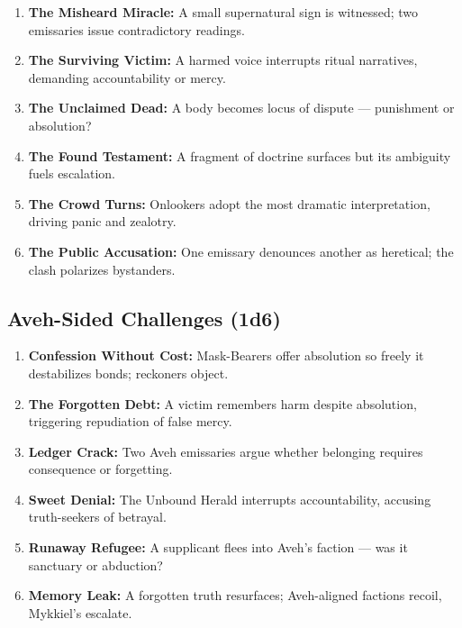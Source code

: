 \documentclass[11pt]{article}
\begin{document}
\begin{enumerate}[leftmargin=*]
  \item \textbf{The Misheard Miracle:} A small supernatural sign is
        witnessed; two emissaries issue contradictory readings.
  \item \textbf{The Surviving Victim:} A harmed voice interrupts ritual
        narratives, demanding accountability or mercy.
  \item \textbf{The Unclaimed Dead:} A body becomes locus of dispute ---
        punishment or absolution?
  \item \textbf{The Found Testament:} A fragment of doctrine surfaces
        but its ambiguity fuels escalation.
  \item \textbf{The Crowd Turns:} Onlookers adopt the most dramatic
        interpretation, driving panic and zealotry.
  \item \textbf{The Public Accusation:} One emissary denounces another
        as heretical; the clash polarizes bystanders.
\end{enumerate}

\subsection{Aveh-Sided Challenges (1d6)}

\begin{enumerate}[leftmargin=*]
  \item \textbf{Confession Without Cost:} Mask-Bearers offer absolution
        so freely it destabilizes bonds; reckoners object.
  \item \textbf{The Forgotten Debt:} A victim remembers harm despite
        absolution, triggering repudiation of false mercy.
  \item \textbf{Ledger Crack:} Two Aveh emissaries argue whether
        belonging requires consequence or forgetting.
  \item \textbf{Sweet Denial:} The Unbound Herald interrupts accountability,
        accusing truth-seekers of betrayal.
  \item \textbf{Runaway Refugee:} A supplicant flees into Aveh's faction ---
        was it sanctuary or abduction?
  \item \textbf{Memory Leak:} A forgotten truth resurfaces; Aveh-aligned
        factions recoil, Mykkiel's escalate.
\end{enumerate}

\end{document}
